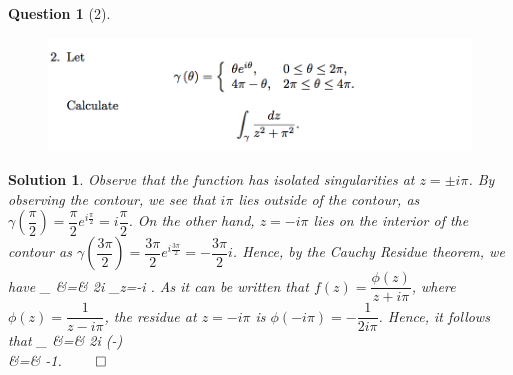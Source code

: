 \documentclass{article} %
\def\eQb#1\eQe{\begin{eqnarray*}#1\end{eqnarray*}}
\theoremstyle{quest}
\newtheorem*{question}{Question}
\newtheorem*{solution}{Solution}
\begin{document}
\bigskip
\begin{question}[2]
\hfill
\begin{figure}[h!]
\centering
\includegraphics[width=1\textwidth]{cv-9-2}
\end{figure}
\end{question}
\begin{solution}
Observe that the function has isolated singularities at $z = \pm i \pi$. 
By observing the contour, we see that $i \pi$ lies outside of the contour,
as $\gamma(\dfrac{\pi}{2}) = \dfrac{\pi}{2}e^{i\frac{\pi}{2}} = 
i\dfrac{\pi}{2}$. On the other hand, $z = -i\pi$ lies on the interior of the
contour 
as $\gamma(\dfrac{3\pi}{2}) = \dfrac{3\pi}{2}e^{i\frac{3\pi}{2}} =
-\dfrac{3\pi}{2}i$. Hence, by the Cauchy Residue theorem, we have
\eQb
\int_{\gamma}  &=& 2\pi i _{z=-i\pi} 
.
\eQe  
As it can be written that $f(z) = \dfrac{\phi(z)}{z+i\pi}$, where
$\phi(z) = \dfrac{1}{z - i\pi}$, the residue at $z=-i\pi$ is 
$\phi(-i\pi) = -\dfrac{1}{2i\pi}$. Hence, it follows that
\eQb
\int_{\gamma}  &=& 2\pi i (-) \\
&=& -1. 
\eQe
\hfill $\qed$
\end{solution}

\newpage
\end{document}
